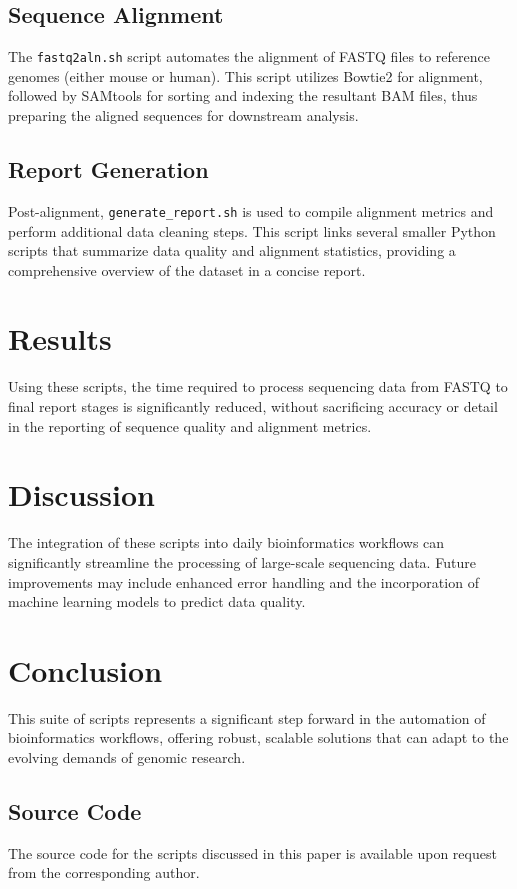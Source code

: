 \documentclass[unnumsec,webpdf,contemporary,large]{oup-authoring-template}%
\theoremstyle{thmstyleone}%
\begin{document}
\subsection{Sequence Alignment}
The \texttt{fastq2aln.sh} script automates the alignment of FASTQ files to reference genomes (either mouse or human). This script utilizes Bowtie2 for alignment, followed by SAMtools for sorting and indexing the resultant BAM files, thus preparing the aligned sequences for downstream analysis.

\subsection{Report Generation}
Post-alignment, \texttt{generate\_report.sh} is used to compile alignment metrics and perform additional data cleaning steps. This script links several smaller Python scripts that summarize data quality and alignment statistics, providing a comprehensive overview of the dataset in a concise report.

\section{Results}
Using these scripts, the time required to process sequencing data from FASTQ to final report stages is significantly reduced, without sacrificing accuracy or detail in the reporting of sequence quality and alignment metrics.

\section{Discussion}
The integration of these scripts into daily bioinformatics workflows can significantly streamline the processing of large-scale sequencing data. Future improvements may include enhanced error handling and the incorporation of machine learning models to predict data quality.

\section{Conclusion}
This suite of scripts represents a significant step forward in the automation of bioinformatics workflows, offering robust, scalable solutions that can adapt to the evolving demands of genomic research.

\begin{appendices}

\section{Source Code}
The source code for the scripts discussed in this paper is available upon request from the corresponding author.

\end{appendices}
\end{document}
